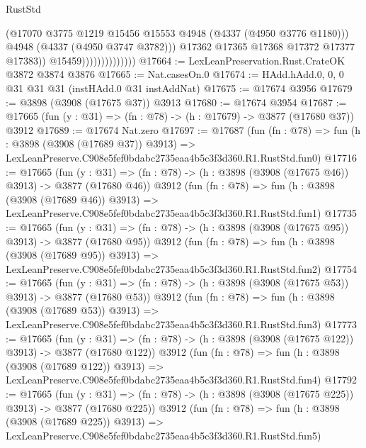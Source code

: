 \begin{lexlean}{RustStd}
\begin{coremodule}
                                      (@17070
                                        @3775
                                        @1219
                                        @15456
                                        @15553
                                        @4948
                                        (@4337 (@4950 @3776 @1180)))
                                      @4948
                                      (@4337 (@4950 @3747 @3782)))
                                    @17362
                                    @17365
                                    @17368
                                    @17372
                                    @17377
                                    @17383))
                                @15459))))))))))))))
@17664 := LexLeanPreservation.Rust.CrateOK @3872 @3874 @3876
@17665 := Nat.casesOn.{0}
@17674 := HAdd.hAdd.{0, 0, 0} @31 @31 @31 (instHAdd.{0} @31 instAddNat)
@17675 := @17674 @3956
@17679 := @3898 (@3908 (@17675 @37)) @3913
@17680 := @17674 @3954
@17687 := @17665 (fun (y : @31) => (fn : @78) -> (h : @17679) -> @3877 (@17680 @37)) @3912
@17689 := @17674 Nat.zero
@17697 := @17687
    (fun (fn : @78) =>
    fun (h : @3898 (@3908 (@17689 @37)) @3913) =>
    LexLeanPreserve.C908e5fef0bdabc2735eaa4b5c3f3d360.R1.RustStd.fun0)
@17716 := @17665
    (fun (y : @31) => (fn : @78) -> (h : @3898 (@3908 (@17675 @46)) @3913) -> @3877 (@17680 @46))
    @3912
    (fun (fn : @78) =>
    fun (h : @3898 (@3908 (@17689 @46)) @3913) =>
    LexLeanPreserve.C908e5fef0bdabc2735eaa4b5c3f3d360.R1.RustStd.fun1)
@17735 := @17665
    (fun (y : @31) => (fn : @78) -> (h : @3898 (@3908 (@17675 @95)) @3913) -> @3877 (@17680 @95))
    @3912
    (fun (fn : @78) =>
    fun (h : @3898 (@3908 (@17689 @95)) @3913) =>
    LexLeanPreserve.C908e5fef0bdabc2735eaa4b5c3f3d360.R1.RustStd.fun2)
@17754 := @17665
    (fun (y : @31) => (fn : @78) -> (h : @3898 (@3908 (@17675 @53)) @3913) -> @3877 (@17680 @53))
    @3912
    (fun (fn : @78) =>
    fun (h : @3898 (@3908 (@17689 @53)) @3913) =>
    LexLeanPreserve.C908e5fef0bdabc2735eaa4b5c3f3d360.R1.RustStd.fun3)
@17773 := @17665
    (fun (y : @31) => (fn : @78) -> (h : @3898 (@3908 (@17675 @122)) @3913) -> @3877 (@17680 @122))
    @3912
    (fun (fn : @78) =>
    fun (h : @3898 (@3908 (@17689 @122)) @3913) =>
    LexLeanPreserve.C908e5fef0bdabc2735eaa4b5c3f3d360.R1.RustStd.fun4)
@17792 := @17665
    (fun (y : @31) => (fn : @78) -> (h : @3898 (@3908 (@17675 @225)) @3913) -> @3877 (@17680 @225))
    @3912
    (fun (fn : @78) =>
    fun (h : @3898 (@3908 (@17689 @225)) @3913) =>
    LexLeanPreserve.C908e5fef0bdabc2735eaa4b5c3f3d360.R1.RustStd.fun5)

\end{coremodule}
\end{lexlean}
